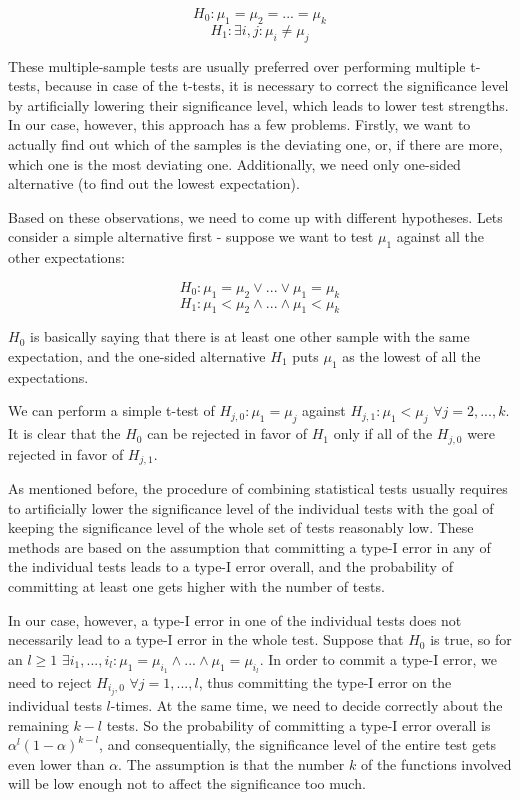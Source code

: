 \[
H_0: \mu_1 = \mu_2 = ... = \mu_k
\]
\[
H_1: \exists i, j: \mu_i \neq \mu_j
\]

These multiple-sample tests are usually preferred over performing multiple t-tests, because in case of the t-tests, it is necessary to correct the significance level by artificially lowering their significance level, which leads to lower test strengths. In our case, however, this approach has a few problems. Firstly, we want to actually find out which of the samples is the deviating one, or, if there are more, which one is the most deviating one. Additionally, we need only one-sided alternative (to find out the lowest expectation). 

Based on these observations, we need to come up with different hypotheses. Lets consider a simple alternative first - suppose we want to test $\mu_1$ against all the other expectations:

\[
H_0: \mu_1 = \mu_2 \vee ... \vee \mu_1 = \mu_k
\]
\[
H_1: \mu_1 < \mu_2 \wedge ... \wedge \mu_1 < \mu_k
\]

$H_0$ is basically saying that there is at least one other sample with the same expectation, and the one-sided alternative $H_1$ puts $\mu_1$ as the lowest of all the expectations.

We can perform a simple t-test of $H_{j,0}: \mu_1 = \mu_j$ against $H_{j,1}: \mu_1 < \mu_j$ $\forall j = 2, ..., k$. It is clear that the $H_0$ can be rejected in favor of $H_1$ only if all of the $H_{j,0}$ were rejected in favor of $H_{j,1}$. 

As mentioned before, the procedure of combining statistical tests usually requires to artificially lower the significance level of the individual tests with the goal of keeping the significance level of the whole set of tests reasonably low. These methods are based on the assumption that committing a type-I error in any of the individual tests leads to a type-I error overall, and the probability of committing at least one gets higher with the number of tests.

In our case, however, a type-I error in one of the individual tests does not necessarily lead to a type-I error in the whole test. Suppose that $H_0$ is true, so for an $l \geq 1$ $\exists i_1,...,i_l: \mu_1 = \mu_{i_1} \wedge ... \wedge \mu_1 = \mu_{i_l}$. In order to commit a type-I error, we need to reject $H_{i_j,0}$ $\forall j = 1, ..., l$, thus committing the type-I error on the individual tests $l$-times. At the same time, we need to decide correctly about the remaining $k-l$ tests. So the probability of committing a type-I error overall is $\alpha^l(1-\alpha)^{k-l}$, and consequentially, the significance level of the entire test gets even lower than $\alpha$. The assumption is that the number $k$ of the functions involved will be low enough not to affect the significance too much. 

